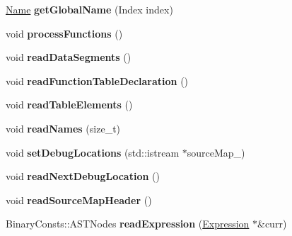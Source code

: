 \begin{DoxyCompactItemize}
\mbox{\hyperlink{structwasm_1_1_name}{Name}} {\bfseries get\+Global\+Name} (Index index)
\item 
\mbox{\label{classwasm_1_1_wasm_binary_builder_af2c6cffcb4f8d2a1d9d50a0ec3a46c9a}} 
void {\bfseries process\+Functions} ()
\item 
\mbox{\label{classwasm_1_1_wasm_binary_builder_a2593774c61fc3a4a19343fe628c53b73}} 
void {\bfseries read\+Data\+Segments} ()
\item 
\mbox{\label{classwasm_1_1_wasm_binary_builder_a336f02ff8caa00cd29947561c7a686be}} 
void {\bfseries read\+Function\+Table\+Declaration} ()
\item 
\mbox{\label{classwasm_1_1_wasm_binary_builder_a4123851e0925cd256f973af02f5377f0}} 
void {\bfseries read\+Table\+Elements} ()
\item 
\mbox{\label{classwasm_1_1_wasm_binary_builder_a99de0757f929e8e38532bb4152f56143}} 
void {\bfseries read\+Names} (size\+\_\+t)
\item 
\mbox{\label{classwasm_1_1_wasm_binary_builder_a097b1c22d0feac1495c917c0e5821fd0}} 
void {\bfseries set\+Debug\+Locations} (std\+::istream $\ast$source\+Map\+\_\+)
\item 
\mbox{\label{classwasm_1_1_wasm_binary_builder_acf71c4644f71712d37192feb0eaf8000}} 
void {\bfseries read\+Next\+Debug\+Location} ()
\item 
\mbox{\label{classwasm_1_1_wasm_binary_builder_aaafe1f45156ce6453a77b9fc2ad94fc6}} 
void {\bfseries read\+Source\+Map\+Header} ()
\item 
\mbox{\label{classwasm_1_1_wasm_binary_builder_a842d555f6a3dbb9dd88fa7f006c207a0}} 
Binary\+Consts\+::\+A\+S\+T\+Nodes {\bfseries read\+Expression} (\mbox{\hyperlink{classwasm_1_1_expression}{Expression}} $\ast$\&curr)
\item 
\mbox{\label{classwasm_1_1_wasm_binary_builder_afa1db0e618323ae10e91b290acd58543}} 

\end{DoxyCompactItemize}
